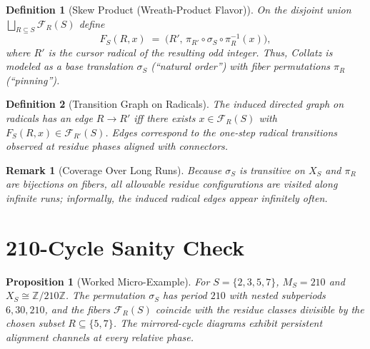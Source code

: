 \documentclass[11pt]{article}
\newtheorem{definition}{Definition}
\newtheorem{remark}{Remark}
\newtheorem{proposition}{Proposition}
\begin{document}
\begin{definition}[Skew Product (Wreath-Product Flavor)]
On the disjoint union $\bigsqcup_{R\subseteq S}\mathcal F_R(S)$ define
\[
  F_S(R,x)\;=\;\big(R',\, \pi_{R'}\circ \sigma_S\circ \pi_R^{-1}(x)\big),
\]
where $R'$ is the cursor radical of the resulting odd integer. Thus, Collatz is modeled as a base translation $\sigma_S$ (``natural order'') with fiber permutations $\pi_R$ (``pinning''). 
\end{definition}

\begin{definition}[Transition Graph on Radicals]
The induced directed graph on radicals has an edge $R\to R'$ iff there exists $x\in\mathcal F_R(S)$ with $F_S(R,x)\in\mathcal F_{R'}(S)$. Edges correspond to the one-step radical transitions observed at residue phases aligned with connectors.
\end{definition}

\begin{remark}[Coverage Over Long Runs]
Because $\sigma_S$ is transitive on $X_S$ and $\pi_R$ are bijections on fibers, all allowable residue configurations are visited along infinite runs; informally, the induced radical edges appear infinitely often.
\end{remark}

\section{210-Cycle Sanity Check}

\begin{proposition}[Worked Micro-Example]
For $S=\{2,3,5,7\}$, $M_S=210$ and $X_S\cong \mathbb Z/210\mathbb Z$. The permutation $\sigma_S$ has period $210$ with nested subperiods $6,30,210$, and the fibers $\mathcal F_R(S)$ coincide with the residue classes divisible by the chosen subset $R\subseteq\{5,7\}$. The mirrored-cycle diagrams exhibit persistent alignment channels at every relative phase.
\end{proposition}
\end{document}
